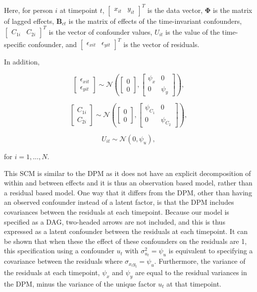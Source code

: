 \documentclass[
]{interact}
\begin{document}
Here, for person \(i\) at timepoint \(t\),
\(\begin{bmatrix} x_{it} & y_{it}\end{bmatrix}^T\) is the data vector,
\(\boldsymbol{\Phi}\) is the matrix of lagged effects,
\(\textbf{B}_{ct}\) is the matrix of effects of the time-invariant
confounders, \(\begin{bmatrix} C_{1i} & C_{2i}\end{bmatrix}^T\) is the
vector of confounder values, \(U_{it}\) is the value of the
time-specific confounder, and
\(\begin{bmatrix}\epsilon_{xit} & \epsilon_{yit}\end{bmatrix}^T\) is the
vector of residuals.

In addition,

\[
\begin{bmatrix}
\epsilon_{xit}\\
\epsilon_{yit}
\end{bmatrix}
\sim
\mathcal{N} \left(\begin{bmatrix} 0\\ 0 \end{bmatrix}, \begin{bmatrix} \psi_x & 0\\ 0 & \psi_y \end{bmatrix} \right),
\]

\[
\begin{bmatrix}
C_{1i}\\
C_{2i}
\end{bmatrix} \sim \mathcal{N}\left(\begin{bmatrix} 0\\0 \end{bmatrix}, \begin{bmatrix}\psi_{C_1} & 0 \\0 & \psi_{C_2} \end{bmatrix} \right),
\]

\[
U_{it} \sim \mathcal{N}\left(0, \psi_u\right),
\]

for \(i = 1,..., N\).

This SCM is similar to the DPM as it does not have an explicit
decomposition of within and between effects and it is thus an
observation based model, rather than a residual based model. One way
that it differs from the DPM, other than having an observed confounder
instead of a latent factor, is that the DPM includes covariances between
the residuals at each timepoint. Because our model is specified as a
DAG, two-headed arrows are not included, and this is thus expressed as a
latent confounder between the residuals at each timepoint. It can be
shown that when these the effect of these confounders on the residuals
are 1, this specification using a confounder \(u_t\) with
\(\sigma_{u_t}^2 = \psi_u\) is equivalent to specifying a covariance
between the residuals where \(\sigma_{x_ty_t} = \psi_u\). Furthermore,
the variance of the residuals at each timepoint, \(\psi_x\) and
\(\psi_y\) are equal to the residual variances in the DPM, minus the
variance of the unique factor \(u_t\) at that timepoint.
\end{document}

